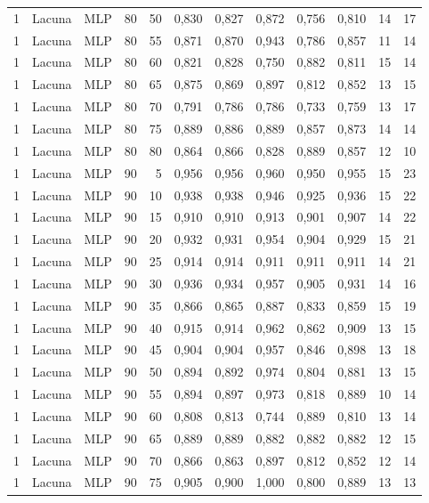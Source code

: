 \begin{longtable}{@{}rllrrrrrrrrr@{}}
1 & Lacuna & MLP & 80 & 50 & 0,830 & 0,827 & 0,872 & 0,756 & 0,810 & 14 & 17 \\
1 & Lacuna & MLP & 80 & 55 & 0,871 & 0,870 & 0,943 & 0,786 & 0,857 & 11 & 14 \\
1 & Lacuna & MLP & 80 & 60 & 0,821 & 0,828 & 0,750 & 0,882 & 0,811 & 15 & 14 \\
1 & Lacuna & MLP & 80 & 65 & 0,875 & 0,869 & 0,897 & 0,812 & 0,852 & 13 & 15 \\
1 & Lacuna & MLP & 80 & 70 & 0,791 & 0,786 & 0,786 & 0,733 & 0,759 & 13 & 17 \\
1 & Lacuna & MLP & 80 & 75 & 0,889 & 0,886 & 0,889 & 0,857 & 0,873 & 14 & 14 \\
1 & Lacuna & MLP & 80 & 80 & 0,864 & 0,866 & 0,828 & 0,889 & 0,857 & 12 & 10 \\
1 & Lacuna & MLP & 90 & 5 & 0,956 & 0,956 & 0,960 & 0,950 & 0,955 & 15 & 23 \\
1 & Lacuna & MLP & 90 & 10 & 0,938 & 0,938 & 0,946 & 0,925 & 0,936 & 15 & 22 \\
1 & Lacuna & MLP & 90 & 15 & 0,910 & 0,910 & 0,913 & 0,901 & 0,907 & 14 & 22 \\
1 & Lacuna & MLP & 90 & 20 & 0,932 & 0,931 & 0,954 & 0,904 & 0,929 & 15 & 21 \\
1 & Lacuna & MLP & 90 & 25 & 0,914 & 0,914 & 0,911 & 0,911 & 0,911 & 14 & 21 \\
1 & Lacuna & MLP & 90 & 30 & 0,936 & 0,934 & 0,957 & 0,905 & 0,931 & 14 & 16 \\
1 & Lacuna & MLP & 90 & 35 & 0,866 & 0,865 & 0,887 & 0,833 & 0,859 & 15 & 19 \\
1 & Lacuna & MLP & 90 & 40 & 0,915 & 0,914 & 0,962 & 0,862 & 0,909 & 13 & 15 \\
1 & Lacuna & MLP & 90 & 45 & 0,904 & 0,904 & 0,957 & 0,846 & 0,898 & 13 & 18 \\
1 & Lacuna & MLP & 90 & 50 & 0,894 & 0,892 & 0,974 & 0,804 & 0,881 & 13 & 15 \\
1 & Lacuna & MLP & 90 & 55 & 0,894 & 0,897 & 0,973 & 0,818 & 0,889 & 10 & 14 \\
1 & Lacuna & MLP & 90 & 60 & 0,808 & 0,813 & 0,744 & 0,889 & 0,810 & 13 & 14 \\
1 & Lacuna & MLP & 90 & 65 & 0,889 & 0,889 & 0,882 & 0,882 & 0,882 & 12 & 15 \\
1 & Lacuna & MLP & 90 & 70 & 0,866 & 0,863 & 0,897 & 0,812 & 0,852 & 12 & 14 \\
1 & Lacuna & MLP & 90 & 75 & 0,905 & 0,900 & 1,000 & 0,800 & 0,889 & 13 & 13 \\

\end{longtable}

